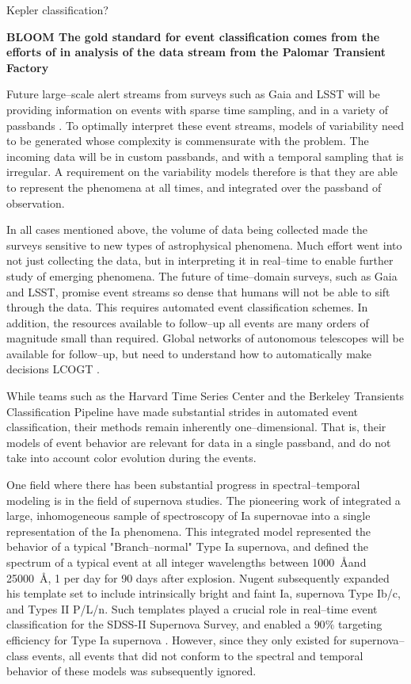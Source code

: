 Kepler classification? \citep{2010ApJ...713L.204B}

{\bf BLOOM The gold standard for event classification comes from the efforts of
\cite{X} in analysis of the data stream from the Palomar Transient Factory
\citep{X}}

Future large--scale alert streams from surveys such as Gaia and LSST will be
providing information on events with sparse time sampling, and in a variety of
passbands \citep{X,Y}.  To optimally interpret these event streams, models of
variability need to be generated whose complexity is commensurate with the
problem. The incoming data will be in custom passbands, and with a temporal
sampling that is irregular.  A requirement on the variability models therefore
is that they are able to represent the phenomena at all times, and integrated
over the passband of observation.

In all cases mentioned above, the volume of data being collected made the
surveys sensitive to new types of astrophysical phenomena. Much effort went into
not just collecting the data, but in interpreting it in real--time to enable
further study of emerging phenomena.  The future of time--domain surveys, such
as Gaia and LSST, promise event streams so dense that humans will not be able to
sift through the data.  This requires automated event classification schemes. In
addition, the resources available to follow--up all events are many orders of
magnitude small than required.  Global networks of autonomous telescopes will be
available for follow--up, but need to understand how to automatically make
decisions LCOGT \citep{2008AN....329..269H}.

 \smallskip

While teams such as the Harvard Time Series Center \citep{} and the Berkeley
Transients Classification Pipeline \citep{} have made substantial strides in
automated event classification, their methods remain inherently
one--dimensional. That is, their models of event behavior are relevant for data
in a single passband, and do not take into account color evolution during the
events.

One field where there has been substantial progress in spectral--temporal
modeling is in the field of supernova studies. The pioneering work of
\cite{2002PASP..114..803N} integrated a large, inhomogeneous sample of
spectroscopy of Ia supernovae into a single representation of the Ia phenomena.
This integrated model represented the behavior of a typical "Branch--normal"
Type Ia supernova, and defined the spectrum of a typical event at all integer
wavelengths between 1000~\AA and 25000~\AA, 1 per day for 90 days after
explosion.  Nugent subsequently expanded his template set to include
intrinsically bright and faint Ia, supernova Type Ib/c, and Types II P/L/n. Such
templates played a crucial role in real--time event classification for the
SDSS-II Supernova Survey, and enabled a $90\%$ targeting efficiency for Type Ia
supernova \citep{2008AJ....135..348S}.  However, since they only existed for
supernova--class events, all events that did not conform to the spectral and
temporal behavior of these models was subsequently ignored.

